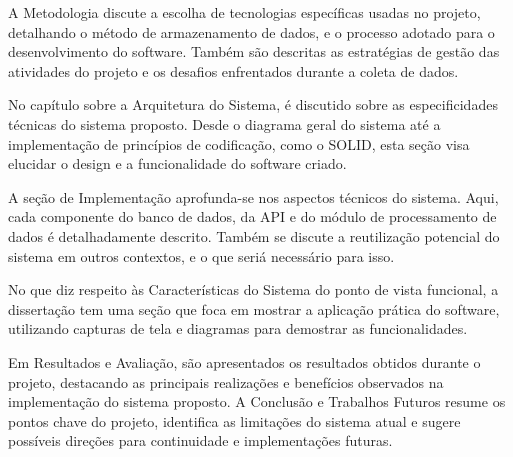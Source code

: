 A Metodologia discute a escolha de tecnologias específicas usadas no projeto, detalhando o método de armazenamento de dados, e o processo adotado para o desenvolvimento do software. Também são descritas as estratégias de gestão das atividades do projeto e os desafios enfrentados durante a coleta de dados.

No capítulo sobre a Arquitetura do Sistema, é discutido sobre as especificidades técnicas do sistema proposto. Desde o diagrama geral do sistema até a implementação de princípios de codificação, como o SOLID, esta seção visa elucidar o design e a funcionalidade do software criado.

A seção de Implementação aprofunda-se nos aspectos técnicos do sistema. Aqui, cada componente do banco de dados, da API e do módulo de processamento de dados é detalhadamente descrito. Também se discute a reutilização potencial do sistema em outros contextos, e o que seriá necessário para isso.

No que diz respeito às Características do Sistema do ponto de vista funcional, a dissertação tem uma seção que foca em mostrar a aplicação prática do software, utilizando capturas de tela e diagramas para demostrar as funcionalidades.

Em Resultados e Avaliação, são apresentados os resultados obtidos durante o projeto, destacando as principais realizações e benefícios observados na implementação do sistema proposto. A Conclusão e Trabalhos Futuros resume os pontos chave do projeto, identifica as limitações do sistema atual e sugere possíveis direções para continuidade e implementações futuras.





